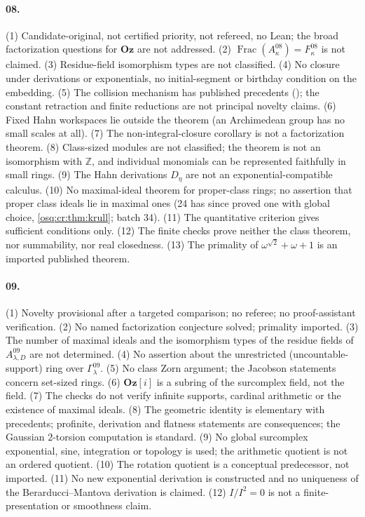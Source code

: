 \documentclass[11pt,letterpaper]{article}
\numberwithin{equation}{section}
\theoremstyle{definition}
\theoremstyle{remark}
\theoremstyle{plain}
\newcommand{\Oz}{\mathbf{Oz}}
\newcommand{\GOz}{\Oz[i]}
\newcommand{\Z}{\mathbb Z}
\newcommand{\Frac}{\operatorname{Frac}}
\begin{document}
\paragraph{08.} (1) Candidate-original, not certified priority, not refereed, no Lean; the broad
factorization questions for $\Oz$ are not addressed. (2) $\Frac(A^{08}_\kappa)=F^{08}_\kappa$ is not
claimed. (3) Residue-field isomorphism types are not classified. (4) No closure under derivations or
exponentials, no initial-segment or birthday condition on the embedding. (5) The collision mechanism
has published precedents (\cite[Proposition~8.2.1]{LM}); the constant retraction and finite reductions
are not principal novelty claims. (6) Fixed Hahn workspaces lie outside the theorem (an Archimedean group has no
small scales at all). (7) The non-integral-closure corollary is not a factorization theorem. (8) Class-sized modules
are not classified; the theorem is not an isomorphism with $\Z$, and individual monomials can be
represented faithfully in small rings. (9) The Hahn derivations $D_\eta$ are not an
exponential-compatible calculus. (10) No maximal-ideal theorem for proper-class rings; no assertion that
proper class ideals lie in maximal ones (24 has since proved one with global choice, \cref{osq:cr:thm:krull}; batch 34). (11) The quantitative criterion gives sufficient conditions
only. (12) The finite checks prove neither the class theorem, nor summability, nor real closedness.
(13) The primality of $\omega^{\sqrt2}+\omega+1$ is an imported published theorem.

\paragraph{09.} (1) Novelty provisional after a targeted comparison; no referee; no proof-assistant
verification. (2) No named factorization conjecture solved; primality imported. (3) The number of
maximal ideals and the isomorphism types of the residue fields of $A^{09}_{\lambda,D}$ are not
determined. (4) No assertion about the unrestricted (uncountable-support) ring over
$\Gamma^{09}_\lambda$. (5) No class Zorn argument; the Jacobson statements concern set-sized rings.
(6) $\GOz$ is a subring of the surcomplex field, not the field. (7) The checks do not verify infinite
supports, cardinal arithmetic or the existence of maximal ideals. (8) The geometric identity is
elementary with precedents; profinite, derivation and flatness statements are consequences; the
Gaussian $2$-torsion computation is standard. (9) No global surcomplex exponential, sine, integration or
topology is used; the arithmetic quotient is not an ordered quotient. (10) The rotation quotient is a
conceptual predecessor, not imported. (11) No new exponential derivation is constructed and no
uniqueness of the Berarducci--Mantova derivation is claimed. (12) $I/I^2=0$ is not a
finite-presentation or smoothness claim.
\end{document}
